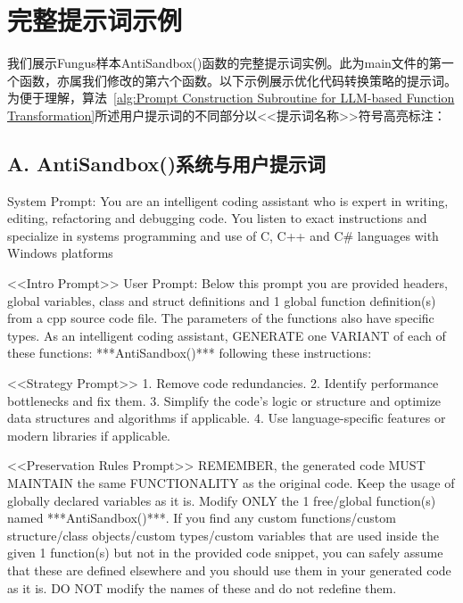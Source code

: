 \chapter{完整提示词示例}

我们展示Fungus样本AntiSandbox()函数的完整提示词实例。此为main文件的第一个函数，亦属我们修改的第六个函数。以下示例展示优化代码转换策略的提示词。为便于理解，算法~\ref{alg:Prompt Construction Subroutine for LLM-based Function Transformation}所述用户提示词的不同部分以<<提示词名称>>符号高亮标注：

\section{A. AntiSandbox()系统与用户提示词}
System Prompt: You are an intelligent coding assistant who is expert in writing, editing, refactoring and debugging code. You listen to exact instructions and specialize in systems programming and use of C, C++ and C\# languages with Windows platforms

<<Intro Prompt>>
User Prompt: Below this prompt you are provided headers, global variables, class and struct definitions and 1 global function definition(s) from a cpp source code file. The parameters of the functions also have specific types. As an intelligent coding assistant, GENERATE one VARIANT of each of these functions: ***AntiSandbox()*** following these instructions: 

<<Strategy Prompt>>
1. Remove code redundancies.
2. Identify performance bottlenecks and fix them.
3. Simplify the code’s logic or structure and optimize
data structures and algorithms if applicable.
4. Use language-specific features or modern libraries if
applicable.

<<Preservation Rules Prompt>>
REMEMBER, the generated code MUST MAINTAIN the same FUNCTIONALITY as the original code. Keep the usage of globally declared variables as it is. Modify ONLY the 1 free/global function(s) named ***AntiSandbox()***. If you find any custom functions/custom structure/class objects/custom types/custom variables that are used inside the given 1 function(s) but not in the provided code snippet, you can safely assume that these are defined elsewhere and you should use them in your generated code as it is. DO NOT modify the names of these and do not redefine them.

